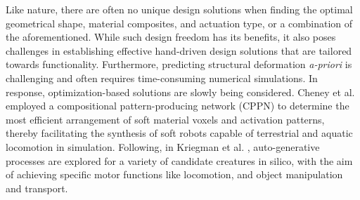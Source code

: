 
Like nature, there are often no unique design solutions when finding the optimal geometrical shape, material composites, and actuation type, or a combination of the aforementioned. While such design freedom has its benefits, it also poses challenges in establishing effective hand-driven design solutions that are tailored towards functionality. Furthermore, predicting structural deformation \textit{a-priori} is challenging and often requires time-consuming numerical simulations. In response, optimization-based solutions are slowly being considered. Cheney et al. \cite{Cheney2013} employed a compositional pattern-producing network (CPPN) to determine the most efficient arrangement of soft material voxels and activation patterns, thereby facilitating the synthesis of soft robots capable of terrestrial and aquatic locomotion in simulation. Following, in Kriegman et al. \cite{Kriegman2019,Kriegman2020}, auto-generative processes are explored for a variety of candidate creatures in silico, with the aim of achieving specific motor functions like locomotion, and object manipulation and transport.

